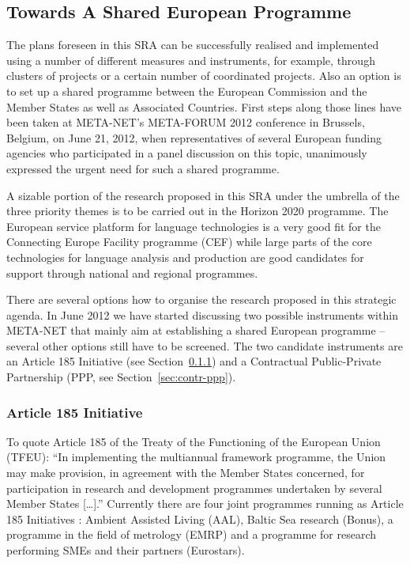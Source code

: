\documentclass[10pt, plain]{../../metanetpaper}
\begin{document}
\begin{multicols}{2}
\subsection{Towards A Shared European Programme}
\label{sec:towards-shar-europ}

The plans foreseen in this SRA can be successfully realised and implemented using a number of different measures and instruments, for example, through clusters of projects or a certain number of coordinated projects. Also an option is to set up a shared programme between the European Commission and the Member States as well as Associated Countries. First steps along those lines have been taken at META-NET's META-FORUM 2012 conference in Brussels, Belgium, on June 21, 2012, when representatives of several European funding agencies who participated in a panel discussion on this topic, unanimously expressed the urgent need for such a shared programme.

A sizable portion of the research proposed in this SRA under the umbrella of the three priority themes is to be carried out in the Horizon 2020 programme. The European service platform for language technologies is a very good fit for the Connecting Europe Facility programme (CEF) while large parts of the core technologies for language analysis and production are good candidates for support through national and regional programmes.

There are several options how to organise the research proposed in this strategic agenda. In June 2012 we have started discussing two possible instruments within META-NET that mainly aim at establishing a shared European programme -- several other options still have to be screened. The two candidate instruments are an Article 185 Initiative (see Section~\ref{sec:article-185-init}) and a Contractual Public-Private Partnership (PPP, see Section~\ref{sec:contr-ppp}).

\subsubsection{Article 185 Initiative}
\label{sec:article-185-init}

To quote Article 185 of the Treaty of the Functioning of the European Union (TFEU): ``In implementing the multiannual framework programme, the Union may make provision, in agreement with the Member States concerned, for participation in research and development programmes undertaken by several Member States [\dots].''  Currently there are four joint programmes running as Article 185 Initiatives \cite{A185}: Ambient Assisted Living (AAL), Baltic Sea research (Bonus), a programme in the field of metrology (EMRP) and a programme for research performing SMEs and their partners (Eurostars).


\end{multicols}
\end{document}
